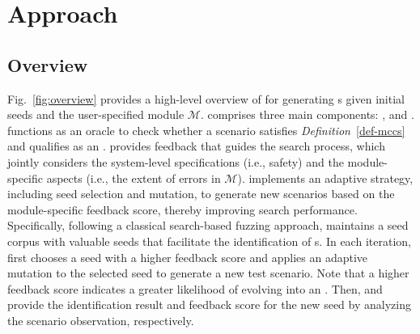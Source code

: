 \section{Approach}\label{sec:method}

\subsection{Overview}
Fig.~\ref{fig:overview} provides a high-level overview of \tool for generating {\mccs}s given initial seeds and the user-specified module $\mathcal{M}$. 
\tool comprises three main components: \oracle, \feedback and \select. 
\oracle functions as an oracle to check whether a scenario satisfies \textit{Definition}~\ref{def-mccs} and qualifies as an \mccs. 
\feedback provides feedback that guides the search process, which jointly considers the system-level specifications (i.e., safety) and the module-specific aspects (i.e., the extent of errors in $\mathcal{M}$).
\select implements an adaptive strategy, including seed selection and mutation, to generate new scenarios based on the module-specific feedback score, thereby improving search performance. 
Specifically, following a classical search-based fuzzing approach, \tool maintains a seed corpus with valuable seeds that facilitate the identification of {\mccs}s. In each iteration, \select first chooses a seed with a higher feedback score and applies an adaptive mutation to the selected seed to generate a new test scenario. Note that a higher feedback score indicates a greater likelihood of evolving into an \mccs. 
Then, \oracle and \feedback provide the identification result and feedback score for the new seed by analyzing the scenario observation, respectively.


